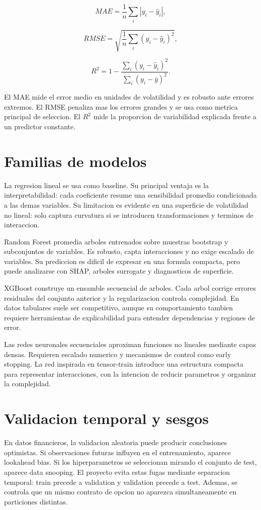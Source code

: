 \[
MAE=\frac{1}{n}\sum_i |y_i-\hat{y}_i|,
\]

\[
RMSE=\sqrt{\frac{1}{n}\sum_i (y_i-\hat{y}_i)^2},
\]

\[
R^2=1-\frac{\sum_i (y_i-\hat{y}_i)^2}{\sum_i (y_i-\bar{y})^2}.
\]

El MAE mide el error medio en unidades de volatilidad y es robusto ante errores extremos. El RMSE penaliza mas los errores grandes y se usa como metrica principal de seleccion. El $R^2$ mide la proporcion de variabilidad explicada frente a un predictor constante.

\section{Familias de modelos}

La regresion lineal se usa como baseline. Su principal ventaja es la interpretabilidad: cada coeficiente resume una sensibilidad promedio condicionada a las demas variables. Su limitacion es evidente en una superficie de volatilidad no lineal: solo captura curvatura si se introducen transformaciones y terminos de interaccion.

Random Forest promedia arboles entrenados sobre muestras bootstrap y subconjuntos de variables. Es robusto, capta interacciones y no exige escalado de variables. Su prediccion es dificil de expresar en una formula compacta, pero puede analizarse con SHAP, arboles surrogate y diagnosticos de superficie.

XGBoost construye un ensamble secuencial de arboles. Cada arbol corrige errores residuales del conjunto anterior y la regularizacion controla complejidad. En datos tabulares suele ser competitivo, aunque su comportamiento tambien requiere herramientas de explicabilidad para entender dependencias y regiones de error.

Las redes neuronales secuenciales aproximan funciones no lineales mediante capas densas. Requieren escalado numerico y mecanismos de control como early stopping. La red inspirada en tensor-train introduce una estructura compacta para representar interacciones, con la intencion de reducir parametros y organizar la complejidad.

\section{Validacion temporal y sesgos}

En datos financieros, la validacion aleatoria puede producir conclusiones optimistas. Si observaciones futuras influyen en el entrenamiento, aparece lookahead bias. Si los hiperparametros se seleccionan mirando el conjunto de test, aparece data snooping. El proyecto evita estas fugas mediante separacion temporal: train precede a validation y validation precede a test. Ademas, se controla que un mismo contrato de opcion no aparezca simultaneamente en particiones distintas.


